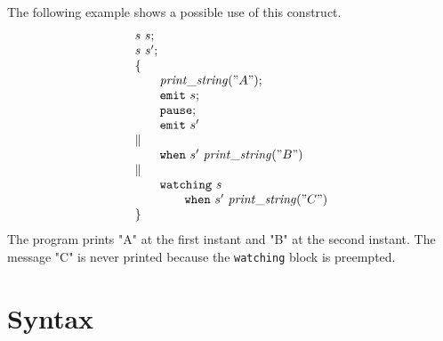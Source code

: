 \documentclass[12pt]{article}
\begin{document}
The following example shows a possible use of this construct.
$$
  \begin{array}{l}
    s~s;                                      \\
    s~s';                                     \\
    \{                                              \\
    \qquad {\mathit{print\_string}}("A");           \\
    \qquad {\tt{emit}}~s;                                 \\
    \qquad {\tt{pause}};                            \\
    \qquad {\tt{emit}}~s'                                 \\
    \parallel                                       \\
    \qquad {\tt{when}}~s'~{\mathit{print\_string}}("B") \\
    \parallel                                       \\
    \qquad {\tt{watching}}~s~                            \\\qquad\qquad{\tt{when}}~s'~{\mathit{print\_string}}("C")\\
    \}
  \end{array}
$$
The program prints "A" at the first instant and "B" at the second instant. The message "C" is never printed
because the {\tt{watching}} block is preempted.

\section{Syntax}
\end{document}
